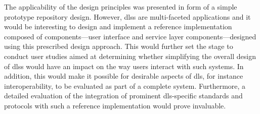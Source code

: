 The applicability of the design principles was presented in form of a simple prototype repository design. However, \glspl{dls} are multi-faceted applications and it would be interesting to design and implement a reference implementation composed of components---user interface and service layer components---designed using this prescribed design approach. This would further set the stage to conduct user studies aimed at determining whether simplifying the overall design of \glspl{dls} would have an impact on the way users interact with such systems. In addition, this would make it possible for desirable aspects of \glspl{dl}, for instance interoperability, to be evaluated as part of a complete system. Furthermore, a detailed evaluation of the integration of prominent \gls{dls}-specific standards and protocols with such a reference implementation would prove invaluable.